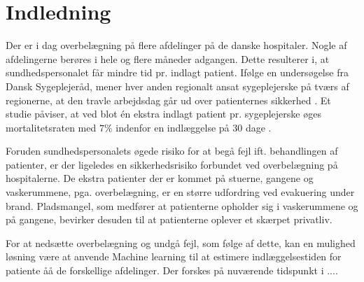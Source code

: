 \chapter{Indledning}
Der er i dag overbelægning på flere afdelinger på de danske hospitaler. Nogle af afdelingerne berøres i hele og flere måneder adgangen. \cite{2015} Dette resulterer i, at sundhedspersonalet får mindre tid pr. indlagt patient. Ifølge en undersøgelse fra Dansk Sygeplejeråd, mener hver anden regionalt ansat sygeplejerske på tværs af regionerne, at den travle arbejdsdag går ud over patienternes sikkerhed \cite{Kjeldsen2015}. Et studie påviser, at ved blot én ekstra indlagt patient pr. sygeplejerske øges mortalitetsraten med $7 \%$ indenfor en indlæggelse på 30 dage  \cite{Aiken2014}. 

Foruden sundhedspersonalets øgede risiko for at begå fejl ift. behandlingen af patienter, er der ligeledes en sikkerhedsrisiko forbundet ved overbelægning på hospitalerne. De ekstra patienter der er kommet på stuerne, gangene og vaskerummene, pga. overbelægning, er en større udfordring ved evakuering under brand. Pladsmangel, som medfører at patienterne opholder sig i vaskerummene og på gangene, bevirker desuden til at patienterne oplever et skærpet privatliv. \cite{Madsen2014}

For at nedsætte overbelægning og undgå fejl, som følge af dette, kan en mulighed løsning være at anvende Machine learning til at estimere indlæggelsestiden for patiente åå de forskellige afdelinger. Der forskes på nuværende tidspunkt i ....